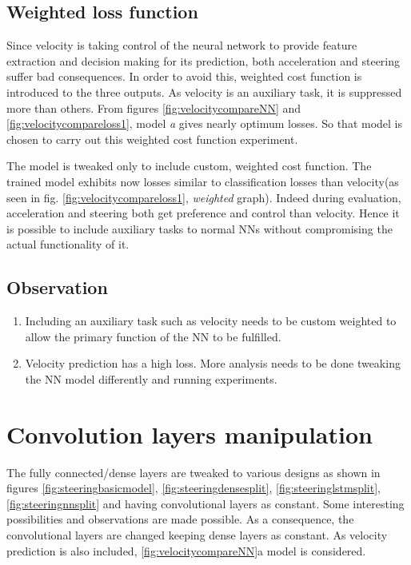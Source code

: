\subsection{Weighted loss function}
Since velocity is taking control of the neural network to provide feature extraction and
decision making for its prediction, both acceleration and steering suffer bad
consequences. In order to avoid this, weighted cost function is introduced to the three
outputs. As velocity is an auxiliary task, it is suppressed more than others. From figures
\ref{fig:velocitycompareNN} and \ref{fig:velocitycompareloss1}, model \textit{a} gives
nearly optimum losses. So that model is chosen to carry out this weighted cost function
experiment.

The model is tweaked only to include custom, weighted cost function. The trained model
exhibits now losses similar to classification losses than velocity(as seen in fig. \ref{fig:velocitycompareloss1}, \textit{weighted} graph). Indeed during
evaluation, acceleration and steering both get preference and control than velocity.
Hence it is possible to include auxiliary tasks to normal NNs without compromising the
actual functionality of it.
\subsection*{Observation}
\begin{enumerate}
    \item Including an auxiliary task such as velocity needs to be custom weighted to
        allow the primary function of the NN to be fulfilled.
    \item Velocity prediction has a high loss. More analysis needs to be done tweaking the
        NN model differently and running experiments.
\end{enumerate}
\section{Convolution layers manipulation}
The fully connected/dense layers are tweaked to various designs as shown in
figures \ref{fig:steeringbasicmodel}, \ref{fig:steeringdensesplit},
\ref{fig:steeringlstmsplit}, \ref{fig:steeringnnsplit} and having convolutional layers as
constant. Some interesting possibilities and observations are made possible. As a
consequence, the convolutional layers are changed keeping dense layers as constant.
As velocity prediction is also included, \ref{fig:velocitycompareNN}{a} model is
considered.

